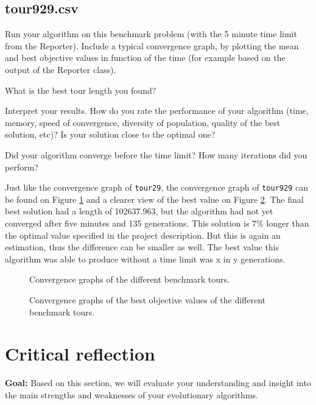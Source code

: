 \documentclass[a4paper,10pt]{article}
\newcommand{\ReplaceMe}[1]{{\color{blue}#1}}
\newcommand{\RemoveMe}[1]{{\color{purple}#1}}
\begin{document}
\subsection{tour929.csv}

\ReplaceMe{Run your algorithm on this benchmark problem (with the 5 minute time limit from the Reporter). Include a typical convergence graph, by plotting the mean and best objective values in function of the time (for example based on the output of the Reporter class). 

What is the best tour length you found? 

Interpret your results. How do you rate the performance of your algorithm (time, memory, speed of convergence, diversity of population, quality of the best solution, etc)? Is your solution close to the optimal one? 

Did your algorithm converge before the time limit? How many iterations did you perform?}

Just like the convergence graph of \texttt{tour29}, the convergence graph of \texttt{tour929} can be found on Figure \ref{fig:graphs} and a clearer view of the best value on Figure \ref{fig:best}. The final best solution had a length of 102637.963, but the algorithm had not yet converged after five minutes and 135 generations. This solution is 7\% longer than the optimal value specified in the project description. But this is again an estimation, thus the difference can be smaller as well. The best value this algorithm was able to produce without a time limit was \ReplaceMe{x} in \ReplaceMe{y} generations.

\begin{figure}[p]
\centering
{}
\caption{Convergence graphs of the different benchmark tours.}
\label{fig:graphs}
\end{figure}

\begin{figure}[p]
\centering
{}
\caption{Convergence graphs of the best objective values of the different benchmark tours.}
\label{fig:best}
\end{figure}

\section{Critical reflection}

\RemoveMe{\textbf{Goal:} Based on this section, we will evaluate your understanding and insight into the main strengths and weaknesses of your evolutionary algorithms.}
\end{document}
